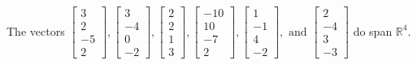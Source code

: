 \begin{exercise}
\begin{exerciseStatement}
  \end{exerciseStatement}
  \begin{exerciseAnswer}
   The vectors \(\left[\begin{array}{r}
3 \\
2 \\
-5 \\
2
\end{array}\right] , \left[\begin{array}{r}
3 \\
-4 \\
0 \\
-2
\end{array}\right] , \left[\begin{array}{r}
2 \\
2 \\
1 \\
3
\end{array}\right] , \left[\begin{array}{r}
-10 \\
10 \\
-7 \\
2
\end{array}\right] , \left[\begin{array}{r}
1 \\
-1 \\
4 \\
-2
\end{array}\right] , \text{ and } \left[\begin{array}{r}
2 \\
-4 \\
3 \\
-3
\end{array}\right]\) 
  	 do  
	span \(\mathbb{R}^4\).
  


  \end{exerciseAnswer}
\end{exercise}